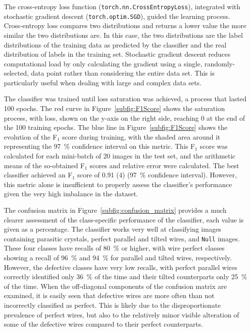 The cross-entropy loss function (\texttt{torch.nn.CrossEntropyLoss}), integrated with sto\-chas\-tic gradient descent (\texttt{torch.optim.SGD}), guided the learning process. Cross-entropy loss compares two distributions and returns a lower value the more similar the two distributions are. In this case, the two distributions are the label distributions of the training data as predicted by the classifier and the real distribution of labels in the training set. Stochastic gradient descent reduces computational load by only calculating the gradient using a single, randomly-selected, data point rather than considering the entire data set. This is particularly useful when dealing with large and complex data sets.

The classifier was trained until loss saturation was achieved, a process that lasted \num{100} epochs. The red curve in Figure~\ref{subfig:F1Score} shows the saturation process, with loss, shown on the y-axis on the right side, reaching \num{0} at the end of the \num{100} training epochs. The blue line in Figure~\ref{subfig:F1Score} shows the evolution of the F\(_1\) score during training, with the shaded area around it representing the \qty{97}{\%} confidence interval on this metric. This F\(_1\) score was calculated for each mini-batch of 20 images in the test set, and the arithmetic means of the so-obtained F\(_1\) scores and relative error were calculated. The best classifier achieved an F\(_1\) score of \num[separate-uncertainty=true]{0.91 (4)} (\qty{97}{\%} confidence interval). However, this metric alone is insufficient to properly assess the classifier's performance given the very high imbalance in the dataset. 

The confusion matrix in Figure~\ref{subfig:confusion_matrix} provides a much clearer assessment of the class-specific performance of the classifier, each value is given as a percentage. The classifier works very well at classifying images containing parasitic crystals, perfect parallel and tilted wires, and \texttt{Null} images. These four classes have recalls of \qty{80}{\%} or higher, with wire perfect classes showing a recall of \qty{96}{\%} and \qty{94}{\%} for parallel and tilted wires, respectively. However, the defective classes have very low recalls, with perfect parallel wires correctly identified only \qty{36}{\%} of the time and their tilted counterparts only \qty{25}{\%} of the time. When the off-diagonal components of the confusion matrix are examined, it is easily seen that defective wires are more often than not incorrectly classified as perfect. This is likely due to the disproportionate prevalence of perfect wires, but also to the relatively minor visible alteration of some of the defective wires compared to their perfect counterparts.

